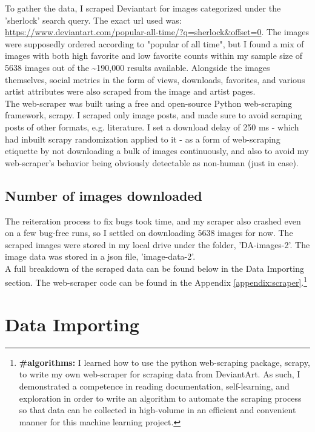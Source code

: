 \documentclass[11pt]{article}
\begin{document}
To gather the data, I scraped Deviantart for images categorized under
the 'sherlock' search query. The exact url used was:
\url{https://www.deviantart.com/popular-all-time/?q=sherlock&offset=0}. The
images were supposedly ordered according to "popular of all time", but
I found a mix of images with both high favorite and low favorite counts
within my sample size of 5638 images out of the \textasciitilde{}190,000
results available. Alongside the images themselves, social metrics in
the form of views, downloads, favorites, and various artist attributes
were also scraped from the image and artist pages.\\

The web-scraper was built using a free and open-source Python
web-scraping framework, scrapy. I scraped only image posts, and made
sure to avoid scraping posts of other formats, e.g. literature. I set a
download delay of 250 ms - which had inbuilt scrapy randomization
applied to it - as a form of web-scraping etiquette by not downloading a
bulk of images continuously, and also to avoid my web-scraper's behavior
being obviously detectable as non-human (just in case).

\subsection{Number of images downloaded}

The reiteration process to fix bugs took time, and my scraper also
crashed even on a few bug-free runs, so I settled on downloading 5638
images for now. The scraped images were stored in my local drive under
the folder, 'DA-images-2'. The image data was stored in a json file,
'image-data-2'.\\

A full breakdown of the scraped data can be found below in the Data
Importing section. The web-scraper code can be found in the Appendix \ref{appendix:scraper}.\footnote{\textbf{\#algorithms:} I learned how to use the python web-scraping package, scrapy, to write my own web-scraper for scraping data from DeviantArt. As such, I demonstrated a competence in reading documentation, self-learning, and exploration in order to write an algorithm to automate the scraping process so that data can be collected in high-volume in an efficient and convenient manner for this machine learning project.}
\newpage
       \section{Data Importing}
\end{document}
